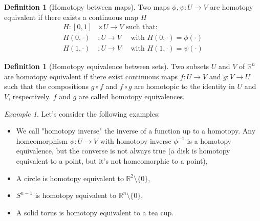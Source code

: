 \documentclass[a4paper,11pt,titlepage, article, oneside]{memoir}
\numberwithin{equation}{section}
\theoremstyle{definition}
\newtheorem{definition}[theorem]{Definition}
\theoremstyle{remark}
\newtheorem{example}[theorem]{Example}
\newcommand{\rfield}{\mathbb{R}}
\begin{document}
\begin{definition}[Homotopy between maps]
  Two maps $\phi, \psi \colon U \rightarrow V$ are homotopy equivalent if there exists a continuous map $H$
  \begin{align*}
    H \colon [0,1] &\times U \rightarrow V \text{ such that:}\\
    H(0, \cdot) &\colon U \rightarrow V \quad \text{ with } H(0, \cdot) = \phi(\cdot) \\
    H(1, \cdot) & \colon U \rightarrow V \quad \text{ with } H(1, \cdot) = \psi(\cdot)
  \end{align*}
\end{definition}

 \begin{definition}[Homotopy equivalence between sets]
   Two subsets $U$ and $V$ of $\rfield^n$ are homotopy equivalent if there exist continuous maps $f \colon U \rightarrow V$ and $g \colon V \rightarrow U$ such that the compositions $g \circ f$ and $f \circ g$ are homotopic to the identity in $U$ and $V$, respectively. $f$ and $g$ are called homotopy equivalences.
 \end{definition}

 \begin{tcolorbox}\begin{example}
   Let's consider the following examples:
   \begin{itemize}
     \item We call "homotopy inverse" the inverse of a function up to a homotopy. Any homeomorphism $\phi \colon U \rightarrow V$ with homotopy inverse $\phi^{-1}$ is a homotopy equivalence, but the converse is not always true (a disk is homotopy equivalent to a point, but it's not homeomorphic to a point),
     \item A circle is homotopy equivalent to $\rfield^2 \setminus \{0\}$,
     \item $S^{n-1}$ is homotopy equivalent to $\rfield^n \setminus \{0\}$,
     \item A solid torus is homotopy equivalent to a tea cup.
   \end{itemize}
 \end{example}\end{tcolorbox}
\end{document}
